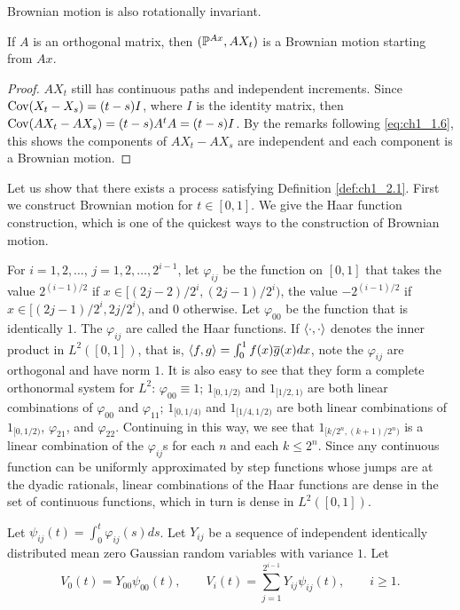 Brownian motion is also rotationally invariant.

\begin{proposition}\label{prop:ch1_2.3}
If $A$ is an orthogonal matrix, then $(\P^{Ax}, AX_t)$ is a Brownian motion starting from $Ax$.
\end{proposition}

\begin{proof}
$AX_t$ still has continuous paths and independent increments. Since $\Cov(X_t - X_s) = (t-s)I$, where $I$ is the identity matrix, then $\Cov(AX_t - AX_s) = (t-s)A^tA = (t-s)I$. By the remarks following \eqref{eq:ch1_1.6}, this shows the components of $AX_t - AX_s$ are independent and each component is a Brownian motion.
\end{proof}


Let us show that there exists a process satisfying Definition \ref{def:ch1_2.1}. First we construct Brownian motion for $t \in [0,1]$. We give the Haar function construction, which is one of the quickest ways to the construction of Brownian motion.

For $i = 1,2,\ldots$, $j = 1,2,\ldots,2^{i-1}$, let $\varphi_{ij}$ be the function on $[0,1]$ that takes the value $2^{(i-1)/2}$ if $x \in [(2j-2)/2^i,(2j-1)/2^i)$, the value $-2^{(i-1)/2}$ if $x \in [(2j-1)/2^i,2j/2^i)$, and 0 otherwise. Let $\varphi_{00}$ be the function that is identically $1$. The $\varphi_{ij}$ are called the Haar functions. If $\lrang{\cdot,\cdot}$ denotes the inner product in $L^2([0,1])$, that is, $\lrang{f,g} = \int_0^1 f(x)\overline{g}(x)dx$, note the $\varphi_{ij}$ are orthogonal and have norm $1$. It is also easy to see that they form a complete orthonormal system for $L^2$: $\varphi_{00} \equiv 1$; $1_{[0,1/2)}$ and $1_{[1/2,1)}$ are both linear combinations of $\varphi_{00}$ and $\varphi_{11}$; $1_{[0,1/4)}$ and $1_{[1/4,1/2)}$ are both linear combinations of $1_{[0,1/2)}$, $\varphi_{21}$, and $\varphi_{22}$. Continuing in this way, we see that $1_{[k/2^n,(k+1)/2^n)}$ is a linear combination of the $\varphi_{ij}$s for each $n$ and each $k \leq 2^n$. Since any continuous function can be uniformly approximated by step functions whose jumps are at the dyadic rationals, linear combinations of the Haar functions are dense in the set of continuous functions, which in turn is dense in $L^2([0,1])$.

Let $\psi_{ij}(t) = \int_0^t \varphi_{ij}(s)ds$. Let $Y_{ij}$ be a sequence of independent identically distributed mean zero Gaussian random variables with variance $1$. Let
\[
    V_0(t) = Y_{00}\psi_{00}(t), \qquad V_i(t) = \sum_{j=1}^{2^{i-1}}Y_{ij}\psi_{ij}(t), \qquad i \geq 1.
\]

